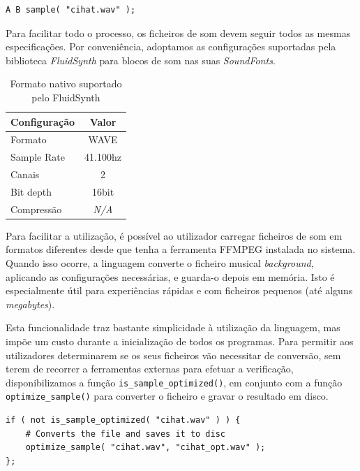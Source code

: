 \begin{lstlisting}[caption=Exemplo de reproduzir um ficheiro a seguir a duas notas]
A B sample( "cihat.wav" );
\end{lstlisting}

Para facilitar todo o processo, os ficheiros de som devem seguir todos as mesmas especificações. Por conveniência, adoptamos as configurações suportadas pela biblioteca \textit{FluidSynth} para blocos de som nas suas \textit{SoundFonts}.

\begin{table}[h]
\centering
\def\arraystretch{1.3}
\begin{tabular}{|l|c|}
\hline
\textbf{Configuração} & \textbf{Valor} \\ \hline
Formato               & WAVE           \\ \hline
Sample Rate           & 41.100hz       \\ \hline
Canais                & 2              \\ \hline
Bit depth             & 16bit          \\ \hline
Compressão            & \textit{N/A}   \\ \hline
\end{tabular}
\caption{Formato nativo suportado pelo FluidSynth}
\label{tab:sounds-format}
\end{table}

Para facilitar a utilização, é possível ao utilizador carregar ficheiros de som em formatos diferentes desde que tenha a ferramenta FFMPEG instalada no sistema. Quando isso ocorre, a linguagem converte o ficheiro musical \textit{background}, aplicando as configurações necessárias, e guarda-o depois em memória. Isto é especialmente útil para experiências rápidas e com ficheiros pequenos (até alguns \textit{megabytes}).

Esta funcionalidade traz bastante simplicidade à utilização da linguagem, mas impõe um custo durante a inicialização de todos os programas. Para permitir aos utilizadores determinarem se os seus ficheiros vão necessitar de conversão, sem terem de recorrer a ferramentas externas para efetuar a verificação, disponibilizamos a função \texttt{is\_sample\_optimized()}, em conjunto com a função \texttt{optimize\_sample()} para converter o ficheiro e gravar o resultado em disco.

\begin{lstlisting}[caption={Verificar se um ficheiro de audio está optimizado, e convertê-lo caso contrário}]
if ( not is_sample_optimized( "cihat.wav" ) ) {
    # Converts the file and saves it to disc
    optimize_sample( "cihat.wav", "cihat_opt.wav" );
};
\end{lstlisting}

